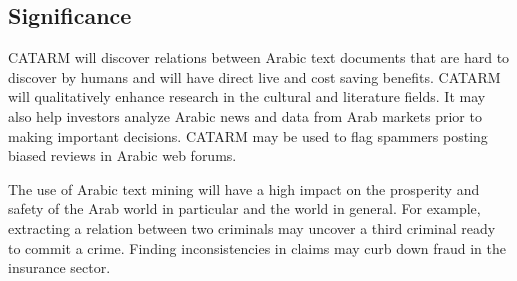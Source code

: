 \documentclass[12pt]{article}
\begin{document}
 
\subsection{Significance} 

CATARM will discover relations between Arabic text documents that 
are hard to discover by humans and will have direct live and
cost saving benefits. %
CATARM will qualitatively enhance research in the cultural and 
literature fields. 
It may also help investors analyze Arabic news and data from Arab 
markets prior to making important decisions.
CATARM may be used to flag spammers 
posting biased reviews in Arabic web forums.

The use of Arabic text mining  will 
have a high impact on the prosperity and safety of the Arab world 
in particular and the world in general.
For example, extracting a relation between two criminals may 
uncover a third criminal ready to commit a crime.
Finding inconsistencies in claims may curb down fraud 
in the insurance sector.
\end{document}
